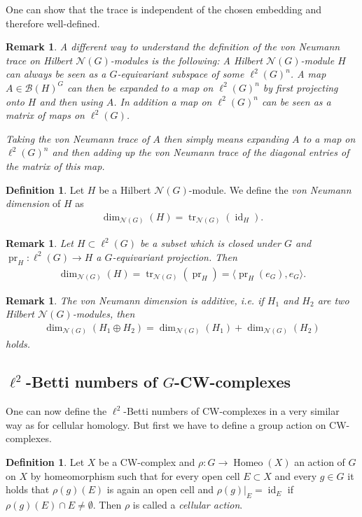 \documentclass[12pt,a4paper]{scrartcl}
\theoremstyle{plain}
\newtheorem{Remark}[Theorem]{Remark}
\theoremstyle{definition}
\newtheorem{Definition}[Theorem]{Definition}
\newcommand{\2}{\mathbb{Z} / 2 \mathbb{Z}}
\newcommand{\1}{\bar{1}}
\newcommand{\0}{\bar{0}}
\newcommand{\tr}{\operatorname{tr}}
\newcommand{\pr}{\operatorname{pr}}
\newcommand{\Homeo}{\operatorname{Homeo}}
\newcommand{\id}{\operatorname{id}}
\begin{document}
One can show that the trace is independent of the chosen embedding and therefore well-defined.
\begin{Remark}
	A different way to understand the definition of the von Neumann trace on Hilbert $\mathcal{N}(G)$-modules is the following:
	A Hilbert $\mathcal{N}(G)$-module $H$ can always be seen as a $G$-equivariant subspace of some $\ell^2(G)^n$. A map $A \in \mathcal{B}(H)^G$ can then be expanded to a map on $\ell^2(G)^n$ by first projecting onto $H$ and then using $A$. In addition a map on $\ell^2(G)^n$ can be seen as a matrix of maps on $\ell^2(G)$.
	
	Taking the von Neumann trace of $A$ then simply means expanding $A$ to a map on $\ell^2(G)^n$ and then adding up the von Neumann trace of the diagonal entries of the matrix of this map.
\end{Remark}
\begin{Definition}\label{vNd}
	Let $H$ be a Hilbert $\mathcal{N}(G)$-module. We define the \emph{von Neumann dimension} of $H$ as
	\begin{align*}
		\dim_{\mathcal{N}(G)}(H) = \tr_{\mathcal{N}(G)}(\id_H).
	\end{align*}
\end{Definition}
\begin{Remark}\label{vNd_for_subsets}
	Let $H \subset \ell^2(G)$ be a subset which is closed under $G$ and $\pr_H\colon\ell^2(G) \to H$ a $G$-equivariant projection. Then
	\begin{align*}
	\dim_{\mathcal{N}(G)}(H) = \tr_{\mathcal{N}(G)}(\pr_H) = \langle \pr_H (e_G), e_G \rangle.
	\end{align*}
\end{Remark}
\begin{Remark}
	The von Neumann dimension is additive, i.e. if $H_1$ and $H_2$ are two Hilbert $\mathcal{N}(G)$-modules, then
	\begin{align*}
		\dim_{\mathcal{N}(G)}(H_1 \oplus H_2) = \dim_{\mathcal{N}(G)}(H_1) + \dim_{\mathcal{N}(G)}(H_2)
	\end{align*}
	holds.
\end{Remark}

\subsection{$\ell^2$-Betti numbers of $G$-CW-complexes}
One can now define the $\ell^2$-Betti numbers of CW-complexes in a very similar way as for cellular homology. But first we have to define a group action on CW-complexes.
\begin{Definition}
	Let $X$ be a CW-complex and $\rho\colon G \to \Homeo(X)$ an action of $G$ on $X$ by homeomorphism such that for every open cell $E \subset X$ and every $g \in G$ it holds that $\rho(g)(E)$ is again an open cell and $\rho(g)|_{E} = \id_E$ if $\rho(g)(E) \cap E \neq \emptyset$. Then $\rho$ is called a \emph{cellular action}.
\end{Definition}
\end{document}
